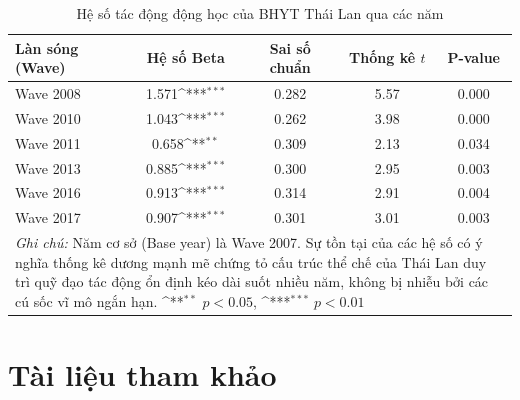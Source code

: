 \documentclass[12pt,a4paper]{article}
\begin{document}
\begin{table}[htbp]
	\centering
	\def\sym#1{\ifmmode^{#1}\else\(^{#1}\)\fi}
	\caption{Hệ số tác động động học của BHYT Thái Lan qua các năm}
	\label{tab:event_study_tvsep}
	\begin{tabular}{lcccc}
		\toprule
		\textbf{Làn sóng (Wave)} & \textbf{Hệ số Beta} & \textbf{Sai số chuẩn} & \textbf{Thống kê $t$} & \textbf{P-value} \\
		\midrule
		Wave 2008 & 1.571\sym{***} & 0.282 & 5.57 & 0.000 \\
		Wave 2010 & 1.043\sym{***} & 0.262 & 3.98 & 0.000 \\
		Wave 2011 & 0.658\sym{**} & 0.309 & 2.13 & 0.034 \\
		Wave 2013 & 0.885\sym{***} & 0.300 & 2.95 & 0.003 \\
		Wave 2016 & 0.913\sym{***} & 0.314 & 2.91 & 0.004 \\
		Wave 2017 & 0.907\sym{***} & 0.301 & 3.01 & 0.003 \\
		\bottomrule
		\multicolumn{5}{p{13cm}}{\footnotesize \textit{Ghi chú:} Năm cơ sở (Base year) là Wave 2007. Sự tồn tại của các hệ số có ý nghĩa thống kê dương mạnh mẽ chứng tỏ cấu trúc thể chế của Thái Lan duy trì quỹ đạo tác động ổn định kéo dài suốt nhiều năm, không bị nhiễu bởi các cú sốc vĩ mô ngắn hạn. \sym{**} \(p<0.05\), \sym{***} \(p<0.01\)}
	\end{tabular}
\end{table}
	
\clearpage
\section*{Tài liệu tham khảo}
\printbibliography[heading=none, title={}]
\renewcommand{\bibfont}{\small}
\end{document}
